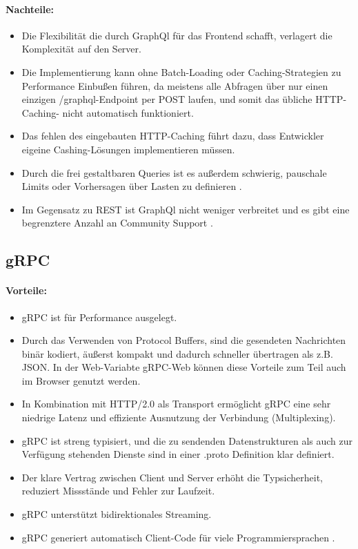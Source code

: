 \paragraph{Nachteile:}
\begin{itemize}
	\item Die Flexibilität die durch GraphQl für das Frontend schafft, verlagert die Komplexität auf den Server. 
	\item Die Implementierung kann ohne Batch-Loading oder Caching-Strategien zu Performance Einbußen führen, da meistens alle Abfragen über nur einen einzigen /graphql-Endpoint per POST laufen, und somit das übliche HTTP-Caching- nicht automatisch funktioniert. 
	\item Das fehlen des eingebauten HTTP-Caching führt dazu, dass Entwickler eigeine Cashing-Lösungen implementieren müssen. 
	\item Durch die frei gestaltbaren Queries ist es außerdem schwierig, pauschale Limits oder Vorhersagen über Lasten zu definieren \parencite{graphql-org,amazon2025graphql,redhat-apiguide}.
	\item Im Gegensatz zu REST ist GraphQl nicht weniger verbreitet und es gibt eine begrenztere Anzahl an Community Support \parencite{postman2022, postman2023}.
\end{itemize}

\subsection{gRPC}

\paragraph{Vorteile:}
\begin{itemize}
	\item gRPC ist für Performance ausgelegt.  
	\item Durch das Verwenden von Protocol Buffers, sind die gesendeten Nachrichten binär kodiert, äußerst kompakt und dadurch schneller übertragen als z.B. JSON. In der Web-Variabte gRPC-Web können diese Vorteile zum Teil auch im Browser genutzt werden. 
	\item In Kombination mit HTTP/2.0 als Transport ermöglicht gRPC eine sehr niedrige Latenz und effiziente Ausnutzung der Verbindung (Multiplexing). 
	\item gRPC ist streng typisiert, und die zu sendenden Datenstrukturen als auch zur Verfügung stehenden Dienste sind in einer .proto Definition klar definiert. 
	\item Der klare Vertrag zwischen Client und Server erhöht die Typsicherheit, reduziert Missstände und Fehler zur Laufzeit.
	\item gRPC unterstützt bidirektionales Streaming. 
	\item gRPC generiert automatisch Client-Code für viele Programmiersprachen \parencite{gRPCAbout}.
\end{itemize}

